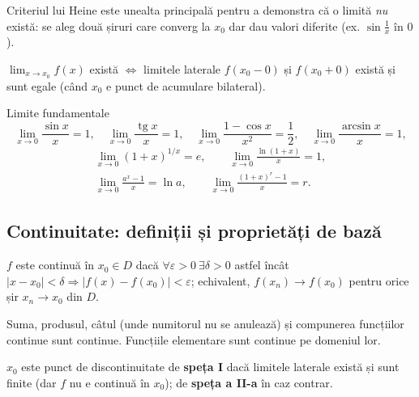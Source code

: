 \begin{obs}
Criteriul lui Heine este unealta principală pentru a demonstra că o limită \emph{nu} există: se aleg două șiruri care converg la $x_0$ dar dau valori diferite (ex. $\sin\frac{1}{x}$ în $0$).
\end{obs}

\begin{propozitie}
$\lim_{x\to x_0} f(x)$ există $\iff$ limitele laterale $f(x_0-0)$ și $f(x_0+0)$ există și sunt egale (când $x_0$ e punct de acumulare bilateral).
\end{propozitie}

\begin{tehbox}{Limite fundamentale}
\[
\lim_{x\to 0}\frac{\sin x}{x}=1,\quad
\lim_{x\to 0}\frac{\operatorname{tg} x}{x}=1,\quad
\lim_{x\to 0}\frac{1-\cos x}{x^2}=\frac12,\quad
\lim_{x\to 0}\frac{\arcsin x}{x}=1,
\]
\[
\begin{gathered}
\lim_{x\to 0}(1+x)^{1/x}=e,\qquad
\lim_{x\to 0}\frac{\ln(1+x)}{x}=1,\\
\lim_{x\to 0}\frac{a^x-1}{x}=\ln a,\qquad
\lim_{x\to 0}\frac{(1+x)^r-1}{x}=r.
\end{gathered}
\]
\end{tehbox}

\subsection{Continuitate: definiții și proprietăți de bază}

\begin{definitie}
$f$ este continuă în $x_0\in D$ dacă $\forall\varepsilon>0\ \exists\delta>0$ astfel încât $|x-x_0|<\delta \Rightarrow |f(x)-f(x_0)|<\varepsilon$; echivalent, $f(x_n)\to f(x_0)$ pentru orice șir $x_n\to x_0$ din $D$.
\end{definitie}

\begin{propozitie}
Suma, produsul, câtul (unde numitorul nu se anulează) și compunerea funcțiilor continue sunt continue. Funcțiile elementare sunt continue pe domeniul lor.
\end{propozitie}

\begin{definitie}
$x_0$ este punct de discontinuitate de \textbf{speța I} dacă limitele laterale există și sunt finite (dar $f$ nu e continuă în $x_0$); de \textbf{speța a II-a} în caz contrar.
\end{definitie}

